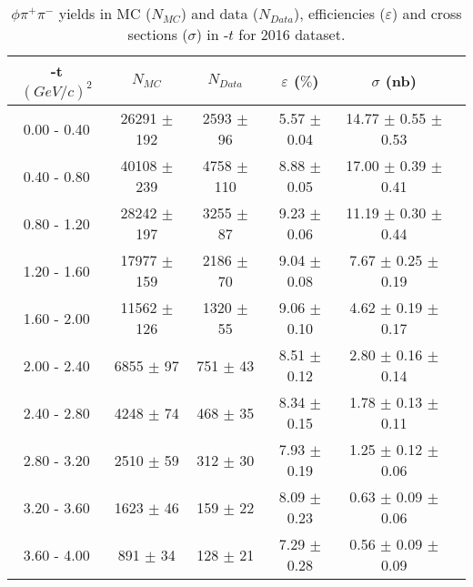 \newpage
\begin{center}
\null
\vfill    
\begin{table}[h]
    \caption{$\phi \pi^{+}\pi^{-}$ yields in MC ($N_{MC}$) and data ($N_{Data}$), efficiencies ($\varepsilon$) and cross sections ($\sigma$) in -$t$ for 2016 dataset.}
    \label{tab.y2175.xsec_ul.phi2pi.1.2}
    \begin{tabular}{|c|c|c|c|c|c|}
    \hline
    -t $(GeV/c)^{2}$ & $N_{MC}$ & $N_{Data}$ & $\varepsilon$ ($\%$) & $\sigma$ (nb) \\ 
    \hline
   0.00 - 0.40 & 26291 $\pm$ 192 & 2593 $\pm$ 96 & 5.57 $\pm$ 0.04 & 14.77 $\pm$ 0.55 $\pm$ 0.53 \\ 
   0.40 - 0.80 & 40108 $\pm$ 239 & 4758 $\pm$ 110 & 8.88 $\pm$ 0.05 & 17.00 $\pm$ 0.39 $\pm$ 0.41 \\ 
   0.80 - 1.20 & 28242 $\pm$ 197 & 3255 $\pm$ 87 & 9.23 $\pm$ 0.06 & 11.19 $\pm$ 0.30 $\pm$ 0.44 \\ 
   1.20 - 1.60 & 17977 $\pm$ 159 & 2186 $\pm$ 70 & 9.04 $\pm$ 0.08 & 7.67 $\pm$ 0.25 $\pm$ 0.19 \\ 
   1.60 - 2.00 & 11562 $\pm$ 126 & 1320 $\pm$ 55 & 9.06 $\pm$ 0.10 & 4.62 $\pm$ 0.19 $\pm$ 0.17 \\ 
   2.00 - 2.40 & 6855 $\pm$ 97 & 751 $\pm$ 43 & 8.51 $\pm$ 0.12 & 2.80 $\pm$ 0.16 $\pm$ 0.14 \\ 
   2.40 - 2.80 & 4248 $\pm$ 74 & 468 $\pm$ 35 & 8.34 $\pm$ 0.15 & 1.78 $\pm$ 0.13 $\pm$ 0.11 \\ 
   2.80 - 3.20 & 2510 $\pm$ 59 & 312 $\pm$ 30 & 7.93 $\pm$ 0.19 & 1.25 $\pm$ 0.12 $\pm$ 0.06 \\ 
   3.20 - 3.60 & 1623 $\pm$ 46 & 159 $\pm$ 22 & 8.09 $\pm$ 0.23 & 0.63 $\pm$ 0.09 $\pm$ 0.06 \\ 
   3.60 - 4.00 & 891 $\pm$ 34 & 128 $\pm$ 21 & 7.29 $\pm$ 0.28 & 0.56 $\pm$ 0.09 $\pm$ 0.09 \\ 
   \hline
\end{tabular}
\end{table}
\end{center}
   
